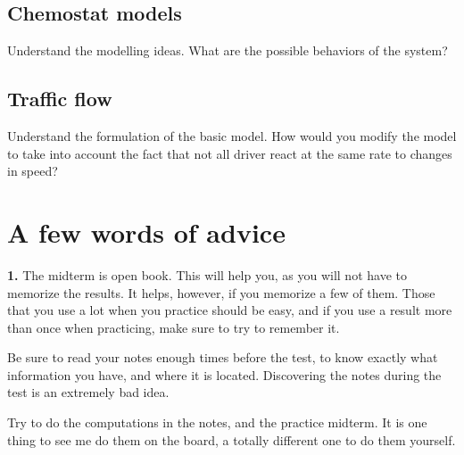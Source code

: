 \documentclass[12pt]{article}
\begin{document}
\subsection*{Chemostat models}
Understand the modelling ideas. What are the possible behaviors of the system?

\subsection*{Traffic flow}
Understand the formulation of the basic model. How would you modify the model to take into account the fact that not all driver react at the same rate to changes in speed?


\section*{A few words of advice}
{\bf 1.} The midterm is open book. This will help you, as you will not have to memorize the results. It helps, however, if you memorize a few of them. Those that you use a lot when you practice should be easy, and if you use a result more than once when practicing, make sure to try to remember it.

 Be sure to read your notes enough times before the test, to know exactly what information you have, and where it is located. Discovering the notes during the test is an extremely bad idea.

 Try to do the computations in the notes, and the practice midterm. It is one thing to see me do them on the board, a totally different one to do them yourself.
\end{document}
